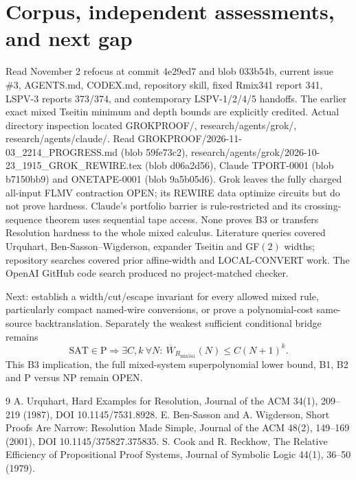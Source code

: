 \documentclass[11pt]{article}
\begin{document}
\section*{Corpus, independent assessments, and next gap}
Read November 2 refocus at commit 4e29ed7 and blob 033b54b, current issue \#3, AGENTS.md, CODEX.md, repository skill, fixed Rmix341 report 341, LSPV-3 reports 373/374, and contemporary LSPV-1/2/4/5 handoffs. The earlier exact mixed Tseitin minimum and depth bounds are explicitly credited. Actual directory inspection located GROKPROOF/, research/agents/grok/, research/agents/claude/. Read GROKPROOF/2026-11-03_2214_PROGRESS.md (blob 59fe73c2), research/agents/grok/2026-10-23_1915_GROK_REWIRE.tex (blob d06a2d56), Claude TPORT-0001 (blob b7150bb9) and ONETAPE-0001 (blob 9a5b05d6). Grok leaves the fully charged all-input FLMV contraction OPEN; its REWIRE data optimize circuits but do not prove hardness. Claude's portfolio barrier is rule-restricted and its crossing-sequence theorem uses sequential tape access. None proves B3 or transfers Resolution hardness to the whole mixed calculus. Literature queries covered Urquhart, Ben-Sasson--Wigderson, expander Tseitin and GF$(2)$ widths; repository searches covered prior affine-width and LOCAL-CONVERT work. The OpenAI GitHub code search produced no project-matched checker.

Next: establish a width/cut/escape invariant for every allowed mixed rule, particularly compact named-wire conversions, or prove a polynomial-cost same-source backtranslation. Separately the weakest sufficient conditional bridge remains
\[
\mathrm{SAT}\in\mathrm P\Longrightarrow
\exists C,k\ \forall N:\ \overline W_{R_{\mathrm{mix341}}}(N)\le C(N+1)^k .
\]
This B3 implication, the full mixed-system superpolynomial lower bound, B1, B2 and P versus NP remain OPEN.
\begin{thebibliography}{9}
 A. Urquhart, Hard Examples for Resolution, Journal of the ACM 34(1), 209--219 (1987), DOI 10.1145/7531.8928.
 E. Ben-Sasson and A. Wigderson, Short Proofs Are Narrow: Resolution Made Simple, Journal of the ACM 48(2), 149--169 (2001), DOI 10.1145/375827.375835.
 S. Cook and R. Reckhow, The Relative Efficiency of Propositional Proof Systems, Journal of Symbolic Logic 44(1), 36--50 (1979).
\end{thebibliography}
\end{document}

